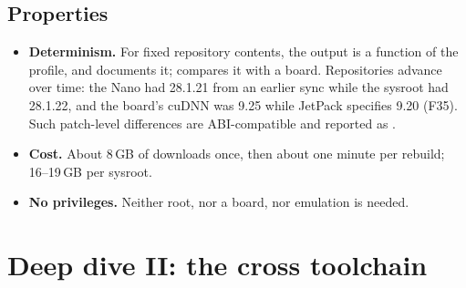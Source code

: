 \documentclass[11pt,a4paper]{article}
\newcommand{\finding}[1]{\textsf{\small F#1}}
\begin{document}
\subsection{Properties}
\begin{itemize}
  \item \textbf{Determinism.} For fixed repository contents, the output is a function of the profile, and
         documents it;  compares it with a board. Repositories advance over
        time: the Nano had  28.1.21 from an earlier sync while the sysroot had 28.1.22, and the board's
        cuDNN was 9.25 while JetPack specifies 9.20 (\finding{35}). Such patch-level differences are ABI-compatible
        and reported as .
  \item \textbf{Cost.} About 8\,GB of downloads once, then about one minute per rebuild; 16--19\,GB per sysroot.
  \item \textbf{No privileges.} Neither root, nor a board, nor emulation is needed.
\end{itemize}

\section{Deep dive II: the cross toolchain}\label{sec:toolchain}
\end{document}
